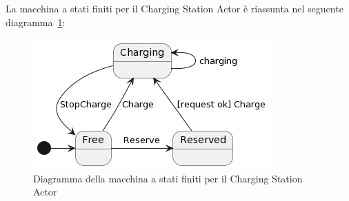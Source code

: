 La macchina a stati finiti per il Charging Station Actor è riassunta nel seguente diagramma \ref{fig:cs-state}:

\begin{figure}[htbp]
    \centering
    \includegraphics[width=\textwidth]{images/cs-state.png}
    \caption{Diagramma della macchina a stati finiti per il Charging Station Actor}
    \label{fig:cs-state}
\end{figure}







\newpage